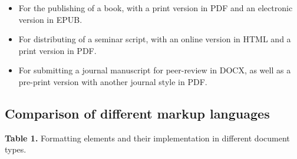 \documentclass[10pt,fleq]{wlpeerj}
\providecommand{\tightlist}{%
  \setlength{\itemsep}{0pt}\setlength{\parskip}{0pt}}
\begin{document}
\begin{itemize}
\tightlist
\item
  For the
  publishing
  of a
  book,
  with a
  print
  version
  in PDF
  and an
  electronic
  version
  in EPUB.
\item
  For
  distributing
  of a
  seminar
  script,
  with an
  online
  version
  in HTML
  and a
  print
  version
  in PDF.
\item
  For
  submitting
  a
  journal
  manuscript
  for
  peer-review
  in DOCX,
  as well
  as a
  pre-print
  version
  with
  another
  journal
  style in
  PDF.
\end{itemize}

\subsection{Comparison
of
different
markup
languages}\label{comparison-of-different-markup-languages}

\textbf{Table
1.}
Formatting
elements
and their
implementation
in
different
document
types.
\end{document}
